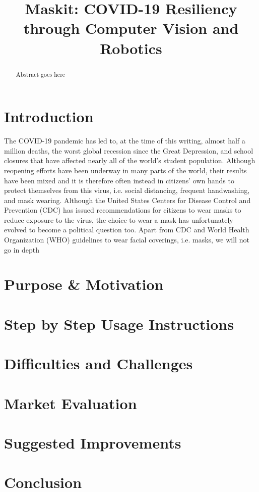 \documentclass[conference, 12pt, onecolumn]{IEEEtran}
\date{}
\begin{document}
\title{Maskit: COVID-19 Resiliency through Computer Vision and Robotics}
\author{ 
\and
{}
}

\maketitle

\begin{abstract}
Abstract goes here\cite{cheng2020role}
\end{abstract}
\section{Introduction}
The COVID-19 pandemic has led to, at the time of this writing, almost half a million deaths, the worst global recession since the Great Depression, and school closures that have affected nearly all of the world's student population. Although reopening efforts have been underway in many parts of the world, their results have been mixed and it is therefore often instead in citizens' own hands to protect themselves from this virus, i.e. social distancing, frequent handwashing, and mask wearing. Although the United States Centers for Disease Control and Prevention (CDC) has issued recommendations for citizens to wear masks to reduce exposure to the virus, the choice to wear a mask has unfortunately evolved to become a political question too. Apart from CDC and World Health Organization (WHO) guidelines to wear facial coverings, i.e. masks, we will not go in depth 
\section{Purpose \& Motivation}
\section{Step by Step Usage Instructions}
\section{Difficulties and Challenges}
\section{Market Evaluation}
\section{Suggested Improvements}
\section{Conclusion}


\end{document}
